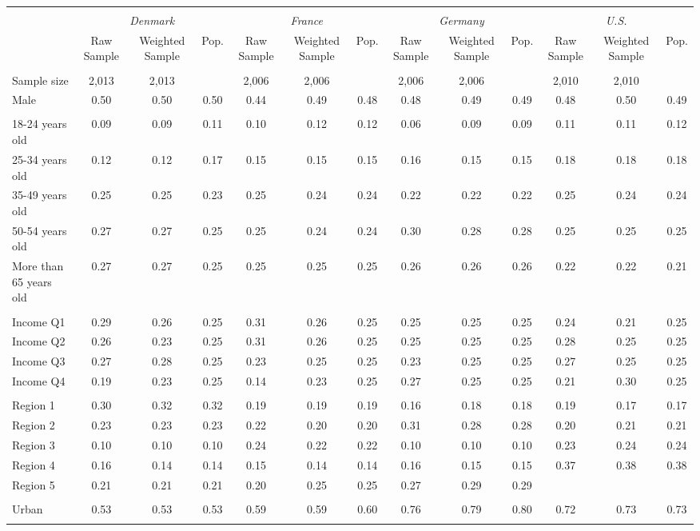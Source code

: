 \begin{tabular}{l*{12}{c}}
\toprule
\hline \\[-1.8ex]
\multicolumn{1}{c}{\em{ }} & \multicolumn{3}{c}{\em{Denmark}} & \multicolumn{3}{c}{\em{France}} & \multicolumn{3}{c}{\em{Germany}} & \multicolumn{3}{c}{\em{U.S.}}\\
\cmidrule(l{3pt}r{3pt}){2-4} \cmidrule(l{3pt}r{3pt}){5-7} \cmidrule(l{3pt}r{3pt}){8-10} \cmidrule(l{3pt}r{3pt}){11-13}
\noalign{\smallskip}  & Raw Sample & Weighted Sample & Pop. & Raw Sample & Weighted Sample & Pop. & Raw Sample & Weighted Sample & Pop. & Raw Sample & Weighted Sample & Pop. \\
\hline \\[-1.8ex] 
Sample size & 2,013 & 2,013 & & 2,006 & 2,006 & & 2,006 & 2,006 & & 2,010 & 2,010 & \\
\noalign{\smallskip}\hline \noalign{\smallskip}Male & 0.50 & 0.50 & 0.50 & 0.44 & 0.49 & 0.48 & 0.48 & 0.49 & 0.49 & 0.48 & 0.50 & 0.49 \\ 
\\
18-24 years old & 0.09 & 0.09 & 0.11 & 0.10 & 0.12 & 0.12 & 0.06 & 0.09 & 0.09 & 0.11 & 0.11 & 0.12 \\
25-34 years old & 0.12 & 0.12 & 0.17 & 0.15 & 0.15 & 0.15 & 0.16 & 0.15 & 0.15 & 0.18 & 0.18 & 0.18 \\
35-49 years old & 0.25 & 0.25 & 0.23 & 0.25 & 0.24 & 0.24 & 0.22 & 0.22 & 0.22 & 0.25 & 0.24 & 0.24 \\
50-54 years old & 0.27 & 0.27 & 0.25 & 0.25 & 0.24 & 0.24 & 0.30 & 0.28 & 0.28 & 0.25 & 0.25 & 0.25 \\
More than 65 years old & 0.27 & 0.27 & 0.25 & 0.25 & 0.25 & 0.25 & 0.26 & 0.26 & 0.26 & 0.22 & 0.22 & 0.21 \\ 
\\
Income Q1 & 0.29 & 0.26 & 0.25 & 0.31 & 0.26 & 0.25 & 0.25 & 0.25 & 0.25 & 0.24 & 0.21 & 0.25 \\
Income Q2 & 0.26 & 0.23 & 0.25 & 0.31 & 0.26 & 0.25 & 0.25 & 0.25 & 0.25 & 0.28 & 0.25 & 0.25 \\
Income Q3 & 0.27 & 0.28 & 0.25 & 0.23 & 0.25 & 0.25 & 0.23 & 0.25 & 0.25 & 0.27 & 0.25 & 0.25 \\
Income Q4 & 0.19 & 0.23 & 0.25 & 0.14 & 0.23 & 0.25 & 0.27 & 0.25 & 0.25 & 0.21 & 0.30 & 0.25 \\
\\
Region 1 & 0.30 & 0.32 & 0.32 & 0.19 & 0.19 & 0.19 & 0.16 & 0.18 & 0.18 & 0.19 & 0.17 & 0.17 \\
Region 2 & 0.23 & 0.23 & 0.23 & 0.22 & 0.20 & 0.20 & 0.31 & 0.28 & 0.28 & 0.20 & 0.21 & 0.21 \\
Region 3 & 0.10 & 0.10 & 0.10 & 0.24 & 0.22 & 0.22 & 0.10 & 0.10 & 0.10 & 0.23 & 0.24 & 0.24 \\
Region 4 & 0.16 & 0.14 & 0.14 & 0.15 & 0.14 & 0.14 & 0.16 & 0.15 & 0.15 & 0.37 & 0.38 & 0.38 \\
Region 5 & 0.21 & 0.21 & 0.21 & 0.20 & 0.25 & 0.25 & 0.27 & 0.29 & 0.29 & & & \\
\\
Urban & 0.53 & 0.53 & 0.53 & 0.59 & 0.59 & 0.60 & 0.76 & 0.79 & 0.80 & 0.72 & 0.73 & 0.73 \\
\\
\bottomrule
\end{tabular}
